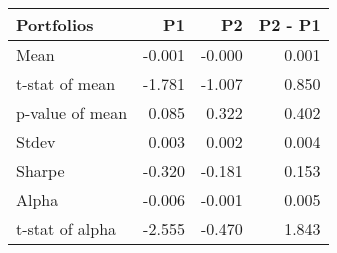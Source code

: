 \begin{tabular}{lrrr}
\toprule
Portfolios & P1 & P2 & P2 - P1 \\
\midrule
Mean & -0.001 & -0.000 & 0.001 \\
t-stat of mean & -1.781 & -1.007 & 0.850 \\
p-value of mean & 0.085 & 0.322 & 0.402 \\
Stdev & 0.003 & 0.002 & 0.004 \\
Sharpe & -0.320 & -0.181 & 0.153 \\
Alpha & -0.006 & -0.001 & 0.005 \\
t-stat of alpha & -2.555 & -0.470 & 1.843 \\
\bottomrule
\end{tabular}
